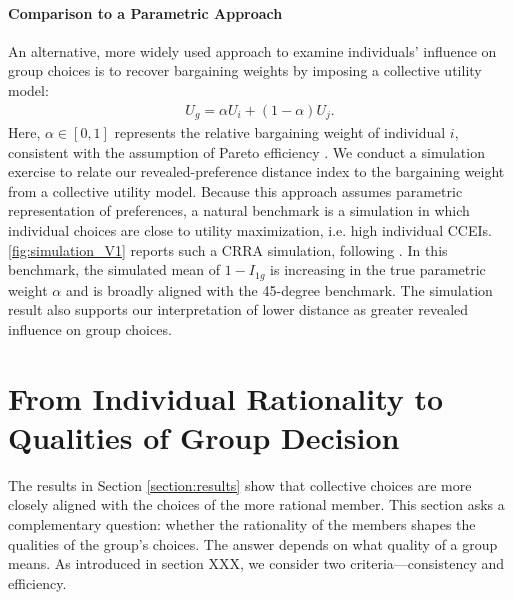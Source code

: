 \documentclass[11 pt]{article}
\begin{document}
\paragraph{Comparison to a Parametric Approach} An alternative, more widely used approach to examine individuals' influence on group choices is to recover bargaining weights by imposing a collective utility model:
\begin{align*}
U_g = \alpha U_i + (1-\alpha) U_j.
\end{align*}
Here, $\alpha \in [0,1]$ represents the relative bargaining weight of individual $i$, consistent with the assumption of Pareto efficiency \citep{Chiappori1988, chiappori1992collective}. We conduct a simulation exercise to relate our revealed-preference distance index to the bargaining weight from a collective utility model. Because this approach assumes parametric representation of preferences, a natural benchmark is a simulation in which individual choices are close to utility maximization, i.e. high individual CCEIs. \autoref{fig:simulation_V1} reports such a CRRA simulation, following \citet{Choietal:2007:AER}. In this benchmark, the simulated mean of $1-I_{1g}$ is increasing in the true parametric weight $\alpha$ and is broadly aligned with the 45-degree benchmark. The simulation result also supports our interpretation of lower distance as greater revealed influence on group choices.

\section{From Individual Rationality to Qualities of Group Decision}

The results in Section \ref{section:results} show that collective choices are more closely aligned with the choices of the more rational member. This section asks a complementary question: whether the rationality of the members shapes the qualities of the group's choices. The answer depends on what quality of a group means. As introduced in section XXX, we consider two criteria---consistency and efficiency. 
\end{document}
